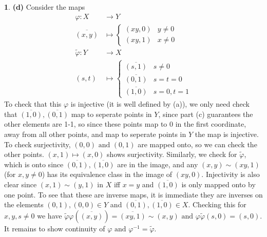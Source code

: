 \documentclass[10.5pt]{article}
\theoremstyle{definition}
\newtheorem{pb}{}
\newcommand{\tand}{\text{ and }}
\begin{document}
\begin{pb}
        \textbf{(d)} Consider the maps
        \begin{align*}
            \varphi: X &\to Y \\
            \overline{(x,y)} &\mapsto \begin{cases}
                (xy,0) & y \neq 0 \\ 
                (xy,1) & x \neq 0
            \end{cases} \\
            \tilde{\varphi}: Y &\to X \\
            (s,t) &\mapsto \begin{cases}
                \overline{(s,1)} & s \neq 0 \\
                \overline{(0,1)} & s = t = 0 \\
                \overline{(1,0)} & s=0, t=1
            \end{cases}
        \end{align*}
        To check that this \(\varphi\) is injective (it is well defined by (a)), we only need check that \(\overline{(1,0)}, \overline{(0,1)}\) map to seperate points in \(Y \), since part (c) guarantees
        the other elements are 1-1, so since these points map to \(0\) in the first coordinate, away from all other points, and map to seperate points in \(Y\) the map is injective.
        To check surjectivity, \((0,0) \tand (0,1)\) are mapped onto, so we can check the other points. \((x,1) \mapsto (x,0)\) shows surjectivity. Similarly, we check for \(\tilde{\varphi}\),
        which is onto since \(\overline{(0,1)}, \overline{(1,0)}\) are in the image, and any
        \((x,y) \sim (xy,1)\) (for \(x,y \neq 0\)) has its equivalence class in the image of \((xy,0)\). Injectivity is also clear since \((x,1) \sim (y,1)\) in \(X\) iff \(x=y\) and \(\overline{(1,0)}\) is only mapped onto by one point.
        To see that these are inverse maps, it is immediate they are inverses on the elements \((0,1),(0,0) \in Y\) and \(\overline{(0,1)},\overline{(1,0)} \in X\).
        Checking this for \(x,y,s \neq 0\) we have \(\tilde{\varphi}\varphi(\overline{(x,y)}) = \overline{(xy,1)} \sim  (x,y) \tand \varphi \tilde{\varphi}(s,0) = (s,0)\). It remains to show continuity of
        \(\varphi \tand \varphi^{-1} = \tilde{\varphi}\).


\end{pb}
\end{document}
